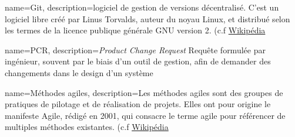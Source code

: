 {
	name=Git,
	description={logiciel de gestion de versions décentralisé. C'est un logiciel libre créé par Linus Torvalds, auteur du noyau Linux, et distribué selon les termes de la licence publique générale GNU version 2.  (c.f \href{https://fr.wikipedia.org/wiki/Git}{Wikipédia}}
}

{
	name=PCR,
	description={\textit{Product Change Request} Requête formulée par ingénieur, souvent par le biais d'un outil de gestion, afin de demander des changements dans le design d'un système}
}

{
	name=Méthodes agiles,
	description={Les méthodes agiles sont des groupes de pratiques de pilotage et de réalisation de projets. Elles ont pour origine le manifeste Agile, rédigé en 2001, qui consacre le terme agile pour référencer de multiples méthodes existantes. (c.f \href{https://fr.wikipedia.org/wiki/Méthode_agile}{Wikipédia}}
}
\glsaddall
